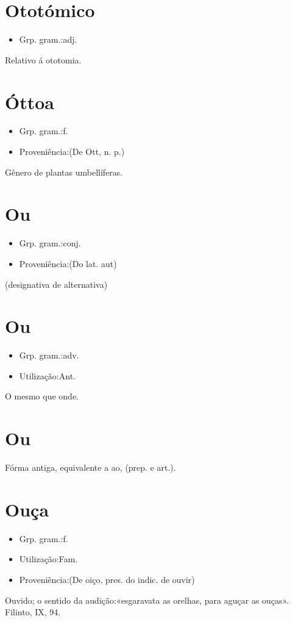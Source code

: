 \section{Ototómico}
\begin{itemize}
\item {Grp. gram.:adj.}
\end{itemize}
Relativo á ototomia.
\section{Óttoa}
\begin{itemize}
\item {Grp. gram.:f.}
\end{itemize}
\begin{itemize}
\item {Proveniência:(De \textunderscore Ott\textunderscore , n. p.)}
\end{itemize}
Gênero de plantas umbellíferas.
\section{Ou}
\begin{itemize}
\item {Grp. gram.:conj.}
\end{itemize}
\begin{itemize}
\item {Proveniência:(Do lat. \textunderscore aut\textunderscore )}
\end{itemize}
(designativa de \textunderscore alternativa\textunderscore )
\section{Ou}
\begin{itemize}
\item {Grp. gram.:adv.}
\end{itemize}
\begin{itemize}
\item {Utilização:Ant.}
\end{itemize}
O mesmo que \textunderscore onde\textunderscore .
\section{Ou}
Fórma antiga, equivalente a \textunderscore ao\textunderscore , (prep. e art.).
\section{Ouça}
\begin{itemize}
\item {Grp. gram.:f.}
\end{itemize}
\begin{itemize}
\item {Utilização:Fam.}
\end{itemize}
\begin{itemize}
\item {Proveniência:(De \textunderscore oiço\textunderscore , pres. do indic. de \textunderscore ouvir\textunderscore )}
\end{itemize}
Ouvido; o sentido da audição:«\textunderscore esgaravata as orelhas, para aguçar as ouças\textunderscore ». Filinto, IX, 94.
